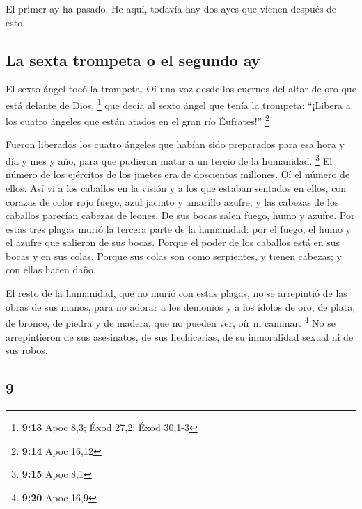\begin{paracol}{2}
 El primer ay ha pasado. He aquí, todavía hay dos ayes
que vienen después de esto.

\hypertarget{la-sexta-trompeta-o-el-segundo-ay}{%
\subsection{La sexta trompeta o el segundo
ay}\label{la-sexta-trompeta-o-el-segundo-ay}}

 El sexto ángel tocó la trompeta. Oí una voz desde los
cuernos del altar de oro que está delante de Dios, \footnote{\textbf{9:13}
  Apoc 8,3; Éxod 27,2; Éxod 30,1-3}  que decía al sexto
ángel que tenía la trompeta: ``¡Libera a los cuatro ángeles que están
atados en el gran río Éufrates!'' \footnote{\textbf{9:14} Apoc 16,12}

 Fueron liberados los cuatro ángeles que habían sido
preparados para esa hora y día y mes y año, para que pudieran matar a un
tercio de la humanidad. \footnote{\textbf{9:15} Apoc 8,1}
 El número de los ejércitos de los jinetes era de
doscientos millones. Oí el número de ellos.  Así vi a los
caballos en la visión y a los que estaban sentados en ellos, con corazas
de color rojo fuego, azul jacinto y amarillo azufre; y las cabezas de
los caballos parecían cabezas de leones. De sus bocas salen fuego, humo
y azufre.  Por estas tres plagas murió la tercera parte
de la humanidad: por el fuego, el humo y el azufre que salieron de sus
bocas.  Porque el poder de los caballos está en sus bocas
y en sus colas. Porque sus colas son como serpientes, y tienen cabezas;
y con ellas hacen daño.

 El resto de la humanidad, que no murió con estas plagas,
no se arrepintió de las obras de sus manos, para no adorar a los
demonios y a los ídolos de oro, de plata, de bronce, de piedra y de
madera, que no pueden ver, oír ni caminar. \footnote{\textbf{9:20} Apoc
  16,9}  No se arrepintieron de sus asesinatos, de sus
hechicerías, de su inmoralidad sexual ni de sus robos.

\switchcolumn
\begin{otherlanguage}{english}

\hypertarget{section-17}{%
\section{9}\label{section-17}}


\end{otherlanguage}
\end{paracol}
